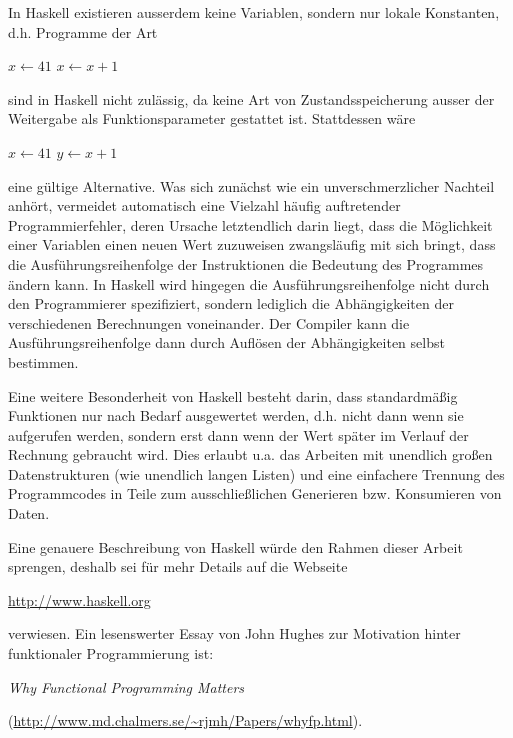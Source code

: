 	In Haskell existieren ausserdem keine Variablen, sondern nur lokale Konstanten, d.h. Programme der Art
		\begin{algorithmic}
			\STATE $x\leftarrow 41$
			\STATE $x\leftarrow x+1$
		\end{algorithmic}
	sind in Haskell nicht zulässig, da keine Art von Zustandsspeicherung ausser der Weitergabe als Funktionsparameter gestattet ist. Stattdessen wäre
		\begin{algorithmic}
			\STATE $x\leftarrow 41$
			\STATE $y\leftarrow x+1$
		\end{algorithmic}
	eine gültige Alternative. Was sich zunächst wie ein unverschmerzlicher Nachteil anhört, vermeidet automatisch eine Vielzahl häufig auftretender Programmierfehler, deren Ursache letztendlich darin liegt, dass die Möglichkeit einer Variablen einen neuen Wert zuzuweisen zwangsläufig mit sich bringt, dass die Ausführungsreihenfolge der Instruktionen die Bedeutung des Programmes ändern kann. In Haskell wird hingegen die Ausführungsreihenfolge nicht durch den Programmierer spezifiziert, sondern lediglich die Abhängigkeiten der verschiedenen Berechnungen voneinander. Der Compiler kann die Aus\-führ\-ungs\-rei\-hen\-fol\-ge dann durch Auflösen der Abhängigkeiten selbst bestimmen.
	
	Eine weitere Besonderheit von Haskell besteht darin, dass standardmäßig Funktionen nur nach Bedarf ausgewertet werden, d.h. nicht dann wenn sie aufgerufen werden, sondern erst dann wenn der Wert später im Verlauf der Rechnung gebraucht wird. Dies erlaubt u.a. das Arbeiten mit unendlich großen Datenstrukturen (wie unendlich langen Listen) und eine einfachere Trennung des  Programmcodes in Teile zum ausschließlichen Generieren bzw. Konsumieren von Daten.
		
	Eine genauere Beschreibung von Haskell würde den Rahmen dieser Arbeit sprengen, deshalb sei für mehr Details auf die Webseite
	
	\url{http://www.haskell.org}
	
	verwiesen. Ein lesenswerter Essay von John Hughes zur Motivation hinter funktionaler Programmierung ist:
	
	{\em Why Functional Programming Matters}
	
	(\url{http://www.md.chalmers.se/~rjmh/Papers/whyfp.html}).
	
	
	
